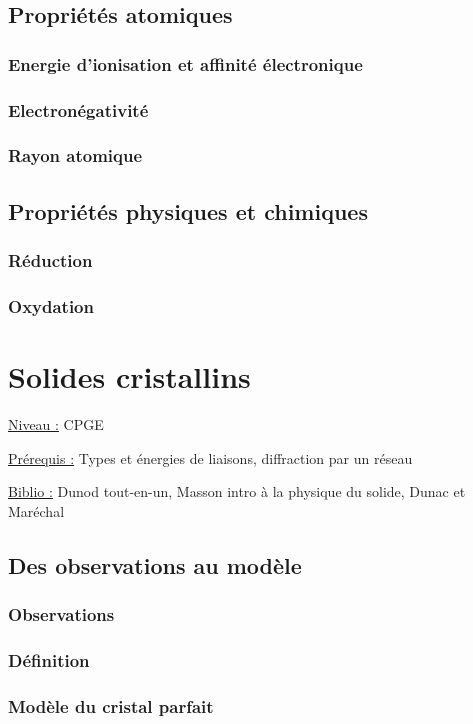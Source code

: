 \documentclass{article}%
\begin{document}
\subsection{Propriétés atomiques}
\subsubsection{Energie d'ionisation et affinité électronique}
\subsubsection{Electronégativité}
\subsubsection{Rayon atomique}
\subsection{Propriétés physiques et chimiques}
\subsubsection{Réduction}
\subsubsection{Oxydation}
\section{Solides cristallins}
\underline{Niveau :} CPGE 

\underline{Prérequis :} Types et énergies de liaisons, diffraction par un réseau

\underline{Biblio :} Dunod tout-en-un, Masson intro à la physique du solide, Dunac et Maréchal

\subsection{Des observations au modèle}

\subsubsection{Observations}
\subsubsection{Définition}
\subsubsection{Modèle du cristal parfait}
\end{document}
